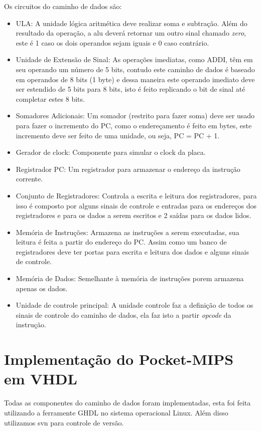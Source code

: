 \documentclass[12pt]{article}
\begin{document}
Os circuitos do caminho de dados são:
\begin{itemize}
 \item ULA: A unidade lógica aritmética deve realizar soma e subtração. Além do resultado da operação, a alu deverá retornar um outro sinal chamado \textit{zero}, este é 1 caso os dois operandos sejam iguais e 0 caso contrário.
 \item Unidade de Extensão de Sinal: As operações imediatas, como ADDI, têm em seu operando um número de 5 bits, contudo este caminho de dados é baseado em operandos de 8 bits (1 byte) e dessa maneira este operando imediato deve ser estendido de 5 bits para 8 bits, isto é feito replicando o bit de sinal até completar estes 8 bits.
 \item Somadores Adicionais: Um somador (restrito para fazer soma) deve ser usado para fazer o incremento do PC, como o endereçamento é feito em bytes, este incremento deve ser feito de uma unidade, ou seja, PC = PC + 1.
 \item Gerador de clock: Componente para simular o clock da placa.
 \item Registrador PC: Um registrador para armazenar o endereço da instrução corrente.
 \item Conjunto de Registradores: Controla a escrita e leitura dos registradores, para isso é composto por alguns sinais de controle e entradas para os endereços dos registradores e para os dados a serem escritos e 2 saídas para os dados lidos.
 \item Memória de Instruções: Armazena as instruções a serem executadas, sua leitura é feita a partir do endereço do PC. Assim como um banco de registradores deve ter portas para escrita e leitura dos dados e alguns sinais de controle.
 \item Memória de Dados: Semelhante à memória de instruções porem armazena apenas os dados.
 \item Unidade de controle principal: A unidade controle faz a definição de todos os sinais de controle do caminho de dados, ela faz isto a partir \textit{opcode} da instrução.
\end{itemize}

\section{Implementação do Pocket-MIPS em VHDL}
\label{implementacao}

Todas as componentes do caminho de dados foram implementadas, esta foi feita utilizando a ferramente GHDL no sistema operacional Linux. Além disso utilizamos svn para controle de versão.
\end{document}
